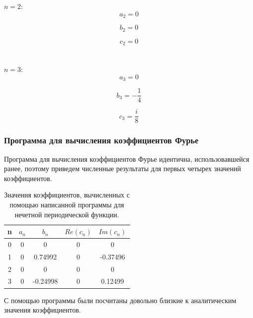 \documentclass[a5paper, 10pt]{article}
\theoremstyle{definition}
\theoremstyle{plain}
\theoremstyle{remark}
\begin{document}
$n = 2:$
\begin{equation}
a_2  = 0
\end{equation}

\begin{equation}
b_2 = 0
\end{equation}

\begin{equation}
c_2  = 0
\end{equation}
\\
\\

$n = 3:$
\begin{equation}
a_3  = 0
\end{equation}

\begin{equation}
b_3 = -\frac{1}{4}
\end{equation}

\begin{equation}
c_3  = \frac{i}{8}
\end{equation}

\newpage
\subsubsection{Программа для вычисления коэффициентов Фурье}

Программа для вычисления коэффициентов Фурье идентична, использовавшейся ранее, поэтому приведем численные результаты для первых четырех значений коэффициентов.

\begin{table}[h]
\caption{Значения коэффициентов, вычисленных с помощью написанной программы для нечетной периодической функции.}
\label{tabular:timesandtenses}
\begin{center}
\begin{tabular}{|c|c|c|c|c|}
\hline
n & $a_n$ & $b_n$ & $Re(c_n)$ & $Im(c_n)$ \\
\hline
0 & 0 & 0 & 0 & 0\\
\hline
1 & 0 & 0.74992 & 0 & -0.37496\\
\hline
2 & 0 & 0 & 0  & 0\\
\hline
3 & 0 & -0.24998 & 0  & 0.12499\\
\hline
\end{tabular}
\end{center}
\end{table}

С помощью программы были посчитаны довольно близкие к аналитическим значения коэффициентов.
\end{document}
